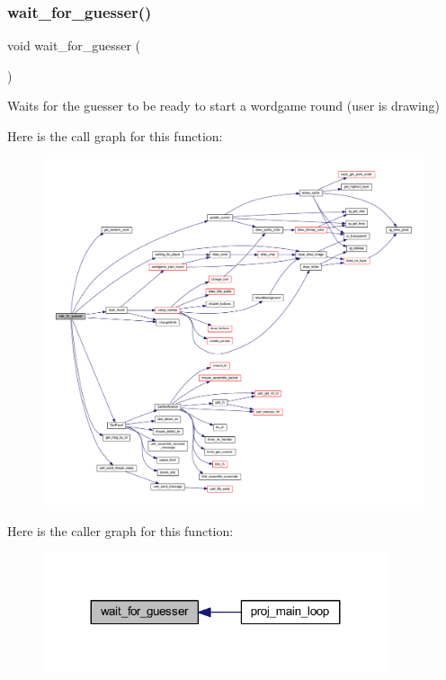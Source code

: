 \subsubsection{\texorpdfstring{wait\+\_\+for\+\_\+guesser()}{wait\_for\_guesser()}}
{\footnotesize\ttfamily void wait\+\_\+for\+\_\+guesser (\begin{DoxyParamCaption}{ }\end{DoxyParamCaption})}



Waits for the guesser to be ready to start a wordgame round (user is drawing) 

Here is the call graph for this function\+:
\nopagebreak
\begin{figure}[H]
\begin{center}
\leavevmode
\includegraphics[width=350pt]{group__pengoo_ga19cfab1706132a19749fc519f84d9445_cgraph}
\end{center}
\end{figure}
Here is the caller graph for this function\+:\nopagebreak
\begin{figure}[H]
\begin{center}
\leavevmode
\includegraphics[width=287pt]{group__pengoo_ga19cfab1706132a19749fc519f84d9445_icgraph}
\end{center}
\end{figure}
\mbox{\label{group__pengoo_gad1277ef243282251ffd9bc319abf4cac}} 
